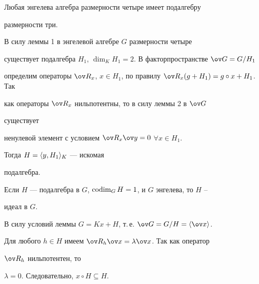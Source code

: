  


\begin{cor} 


Любая энгелева алгебра размерности четыре имеет подалгебру 


размерности три. 


\end{cor} 


 


\begin{pf} 


В силу леммы 1 в энгелевой алгебре $G$ размерности четыре 


существует подалгебра $H_1$, $\dim_K H_1=2$. В факторпространстве $\ov 


G=G/H_1$ 


определим операторы $\ov R_x$, $x\in H_1$, по правилу $\ov 


R_x(g+H_1)=g\circ x+H_1$. Так 


как операторы $\ov R_x$ нильпотентны, то в силу леммы 2 в $\ov G$ 


существует 


ненулевой элемент с условием $\ov R_x\ov y=0$ $\forall x\in H_1$. 


Тогда $H=\langle y,H_1\rangle_K$ --- искомая 


подалгебра. 


\end{pf} 


 


\begin{lem} 


Если $H$ --- подалгебра в $G$, $\operatorname{codim}_G H=1$, и $G$ энгелева, то $H$ -- 


идеал в $G$. 


\end{lem} 


 


\begin{pf} 


В силу условий леммы $G=K x+H$, т.\,е. $\ov G=G/H=\la\ov x\ra$. 


Для любого $h{\in} H$ имеем $\ov R_h\ov x=\lambda\ov x$. Так как оператор 


$\ov R_h$ нильпотентен, то 


$\lambda=0$. Следовательно, $x\circ H\subseteq H$. 


\end{pf} 


